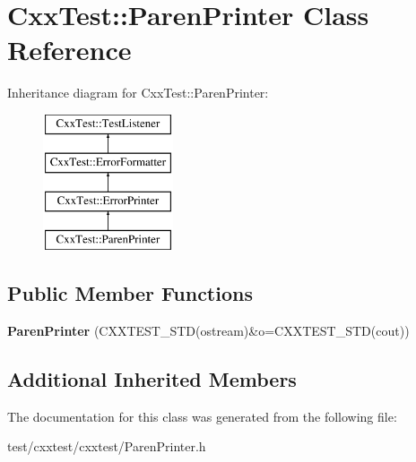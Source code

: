 \hypertarget{classCxxTest_1_1ParenPrinter}{\section{Cxx\-Test\-:\-:Paren\-Printer Class Reference}
\label{classCxxTest_1_1ParenPrinter}
}
Inheritance diagram for Cxx\-Test\-:\-:Paren\-Printer\-:\begin{figure}[H]
\begin{center}
\leavevmode
\includegraphics[height=4.000000cm]{classCxxTest_1_1ParenPrinter}
\end{center}
\end{figure}
\subsection*{Public Member Functions}
\begin{DoxyCompactItemize}
\item 
\hypertarget{classCxxTest_1_1ParenPrinter_aeb793fa2514c8cd1001411487b0440f5}{{\bfseries Paren\-Printer} (C\-X\-X\-T\-E\-S\-T\-\_\-\-S\-T\-D(ostream)\&o=C\-X\-X\-T\-E\-S\-T\-\_\-\-S\-T\-D(cout))}\label{classCxxTest_1_1ParenPrinter_aeb793fa2514c8cd1001411487b0440f5}

\end{DoxyCompactItemize}
\subsection*{Additional Inherited Members}


The documentation for this class was generated from the following file\-:\begin{DoxyCompactItemize}
\item 
test/cxxtest/cxxtest/Paren\-Printer.\-h\end{DoxyCompactItemize}
